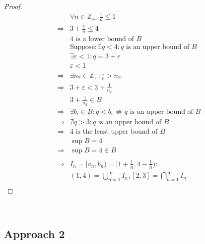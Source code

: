 \documentclass{article}
\begin{document}
\begin{proof}
\begin{align*}
        &\forall n\in\mathbb{Z} _+,\frac{1}{n}\leqslant 1\\
        \Rightarrow&3+\frac{1}{n}\leqslant 4\\
        &4\text{ is a lower bound of }B\\
        &\text{Suppose}: \exists q<4: q\text{ is an upper bound of }B\\
        &\exists \varepsilon<1:q=3+\varepsilon\\
        &\varepsilon<1\\
        \Rightarrow&\exists n_2\in\mathbb{Z} _+:\frac{1}{\varepsilon}>n_2\\
        \Rightarrow&3+\varepsilon<3+\frac{1}{n_2}\\
        &3+\frac{1}{n_2}\in B\\
        \Rightarrow&\exists b_i\in B:q<b_i\nLeftrightarrow q\text{ is an upper bound of }B\\
        \Rightarrow&\nexists q>3:q\text{ is an upper bound of }B\\
        \Rightarrow&4\text{ is the least upper bound of }B\\
        &\sup B=4\\
        \Rightarrow&\sup B =4\in B\\
        &\\
        \Rightarrow&I_n=[a_n,b_n)=[1+\frac{1}{n},4-\frac{1}{n}):\\
        &(1,4)=\bigcup_{n=1}^{\infty}I_n,[2,3]=\bigcap_{n=1}^{\infty}I_n\\
    \end{align*}
\end{proof}

~

\subsection*{Approach 2}

~
\end{document}
